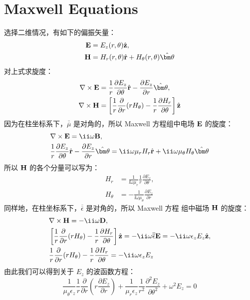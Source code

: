 
\chapter{Maxwell Equations}

选择二维情况，有如下的偏振矢量：
\begin{subequations}
  \begin{align}
    {\bf E} &= E_z(r, \theta) \hat{\bf z}, \\
    {\bf H} &= H_r(r, \theta) \hat{\bf r} + H_\theta(r, \theta) \hat{\bm\theta}
  \end{align}
\end{subequations}
对上式求旋度：
\begin{subequations}
  \begin{align}
    \nabla \times {\bf E} &= \frac{1}{r} \frac{\partial E_z}{\partial\theta}
      \hat{\bf r} - \frac{\partial E_z}{\partial r} \hat{\bm\theta}, \\
    \nabla \times {\bf H} &= \left[\frac{1}{r} \frac{\partial}{\partial r}
      (r H_\theta) - \frac{1}{r} \frac{\partial H_r}{\partial\theta} \right]
      \hat{\bf z}
  \end{align}
\end{subequations}
因为在柱坐标系下，$\overline{\overline\mu}$ 是对角的，所以 Maxwell 方程组中电场
$\bf E$ 的旋度：
\begin{subequations}
  \begin{align}
    & \nabla \times {\bf E} = \ii \omega {\bf B}, \\
    & \frac{1}{r} \frac{\partial E_z}{\partial\theta} \hat{\bf r} -
      \frac{\partial E_z}{\partial r}\hat{\bm\theta} = \ii \omega \mu_r H_r
      \hat{\bf r} + \ii \omega \mu_\theta H_\theta \hat{\bm\theta}
  \end{align}
\end{subequations}
所以 $\bf H$ 的各个分量可以写为：
\begin{subequations}
  \begin{align}
    H_r &= \frac{1}{\ii \omega \mu_r} \frac{1}{r}
      \frac{\partial E_z}{\partial\theta}, \\
    H_\theta &= -\frac{1}{\ii \omega \mu_\theta}
      \frac{\partial E_z}{\partial r}
  \end{align}
\end{subequations}
同样地，在柱坐标系下，$\overline{\overline\epsilon}$ 是对角的，所以 Maxwell 方程
组中磁场 $\bf H$ 的旋度：
\begin{subequations}
  \begin{align}
    & \nabla \times {\bf H} = -\ii \omega {\bf D}, \\
    & \left[\frac{1}{r} \frac{\partial}{\partial r}(r H_\theta) - \frac{1}{r}
      \frac{\partial H_r}{\partial\theta} \right] \hat{\bf z} = -\ii \omega
      {\overline{\overline\epsilon}} {\bf E} = -\ii \omega \epsilon_z E_z
      \hat{\bf z}, \\
    & \frac{1}{r} \frac{\partial}{\partial r}(r H_\theta) - \frac{1}{r}
      \frac{\partial H_r}{\partial\theta} = -\ii \omega \epsilon_z E_z
  \end{align}
\end{subequations}
由此我们可以得到关于 $E_z$ 的波函数方程：
\begin{equation}
  \frac{1}{\mu_\theta \epsilon_z} \frac{1}{r} \frac{\partial}{\partial r}
  \left(r \frac{\partial E_z}{\partial r} \right) + \frac{1}{\mu_r \epsilon_z}
  \frac{1}{r^2} \frac{\partial^2E_z}{\partial\theta^2} +\omega^2 E_z = 0
\end{equation}
